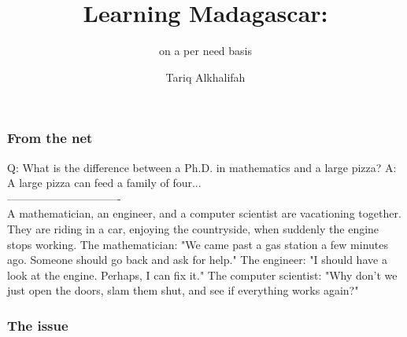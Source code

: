 


\title[]{Learning Madagascar:}
\subtitle{on a per need basis}
\author{Tariq Alkhalifah} 
\date{}
 { \cwpcover }

\def\beq{\begin{equation}}
\def\eeq{\end{equation}}
\def\beqa{\begin{eqnarray}}
\def\eeqa{\end{eqnarray}}


\begin{frame} 
\frametitle{From the net}

Q: What is the difference between a Ph.D. in mathematics and a large pizza?
A: A large pizza can feed a family of four...  \\
-------------------------------\\
A mathematician, an engineer, and a computer scientist are vacationing together. They are riding in a car, enjoying the countryside, when suddenly the engine stops working.
The mathematician: "We came past a gas station a few minutes ago. Someone should go back and ask for help."
The engineer: "I should have a look at the engine. Perhaps, I can fix it."
The computer scientist: "Why don't we just open the doors, slam them shut, and see if everything works again?"  

\end{frame}
\cwpnote{}

\begin{frame} 

\frametitle{The issue}


\end{frame}
\cwpnote{}

